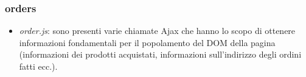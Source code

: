 \documentclass[12pt]{extarticle}
\begin{document}
\subsubsection*{orders}
\begin{itemize}
    \item \textit{order.js}: sono presenti varie chiamate Ajax che hanno lo scopo di ottenere informazioni
    fondamentali per il popolamento del DOM della pagina (informazioni dei prodotti acquistati,
    informazioni sull'indirizzo degli ordini fatti ecc.).
\end{itemize}
\end{document}
